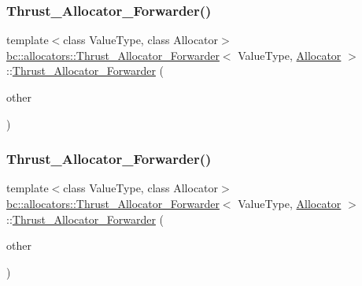 \subsubsection{\texorpdfstring{Thrust\+\_\+\+Allocator\+\_\+\+Forwarder()}{Thrust\_Allocator\_Forwarder()}\hspace{0.1cm}{\footnotesize\ttfamily [3/5]}}
{\footnotesize\ttfamily template$<$class Value\+Type, class Allocator$>$ \\
\hyperlink{structbc_1_1allocators_1_1Thrust__Allocator__Forwarder}{bc\+::allocators\+::\+Thrust\+\_\+\+Allocator\+\_\+\+Forwarder}$<$ Value\+Type, \hyperlink{classbc_1_1allocators_1_1Allocator}{Allocator} $>$\+::\hyperlink{structbc_1_1allocators_1_1Thrust__Allocator__Forwarder}{Thrust\+\_\+\+Allocator\+\_\+\+Forwarder} (\begin{DoxyParamCaption}\item[{const \hyperlink{structbc_1_1allocators_1_1Thrust__Allocator__Forwarder}{Thrust\+\_\+\+Allocator\+\_\+\+Forwarder}$<$ Value\+Type, \hyperlink{classbc_1_1allocators_1_1Allocator}{Allocator} $>$ \&}]{other }\end{DoxyParamCaption})\hspace{0.3cm}{\ttfamily [inline]}}

\mbox{\label{structbc_1_1allocators_1_1Thrust__Allocator__Forwarder_a04b641f81889bd88c31f999a09f84ff9}} 
\subsubsection{\texorpdfstring{Thrust\+\_\+\+Allocator\+\_\+\+Forwarder()}{Thrust\_Allocator\_Forwarder()}\hspace{0.1cm}{\footnotesize\ttfamily [4/5]}}
{\footnotesize\ttfamily template$<$class Value\+Type, class Allocator$>$ \\
\hyperlink{structbc_1_1allocators_1_1Thrust__Allocator__Forwarder}{bc\+::allocators\+::\+Thrust\+\_\+\+Allocator\+\_\+\+Forwarder}$<$ Value\+Type, \hyperlink{classbc_1_1allocators_1_1Allocator}{Allocator} $>$\+::\hyperlink{structbc_1_1allocators_1_1Thrust__Allocator__Forwarder}{Thrust\+\_\+\+Allocator\+\_\+\+Forwarder} (\begin{DoxyParamCaption}\item[{\hyperlink{structbc_1_1allocators_1_1Thrust__Allocator__Forwarder}{Thrust\+\_\+\+Allocator\+\_\+\+Forwarder}$<$ Value\+Type, \hyperlink{classbc_1_1allocators_1_1Allocator}{Allocator} $>$ \&\&}]{other }\end{DoxyParamCaption})\hspace{0.3cm}{\ttfamily [inline]}}

